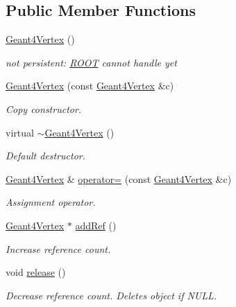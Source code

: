 \subsection*{Public Member Functions}
\begin{DoxyCompactItemize}
\item 
\hyperlink{class_d_d4hep_1_1_simulation_1_1_geant4_vertex_a6c266fa18efd7d4976c36074856c8bc4}{Geant4\+Vertex} ()
\begin{DoxyCompactList}\small\item\em not persistent\+: \hyperlink{namespace_r_o_o_t}{R\+O\+OT} cannot handle yet \end{DoxyCompactList}\item 
\hyperlink{class_d_d4hep_1_1_simulation_1_1_geant4_vertex_a5a5ec2a00b5e3fcdd5bd4b5e02131dbc}{Geant4\+Vertex} (const \hyperlink{class_d_d4hep_1_1_simulation_1_1_geant4_vertex}{Geant4\+Vertex} \&c)
\begin{DoxyCompactList}\small\item\em Copy constructor. \end{DoxyCompactList}\item 
virtual \hyperlink{class_d_d4hep_1_1_simulation_1_1_geant4_vertex_a82165b580eeb1104f6ff9ff27235fba7}{$\sim$\+Geant4\+Vertex} ()
\begin{DoxyCompactList}\small\item\em Default destructor. \end{DoxyCompactList}\item 
\hyperlink{class_d_d4hep_1_1_simulation_1_1_geant4_vertex}{Geant4\+Vertex} \& \hyperlink{class_d_d4hep_1_1_simulation_1_1_geant4_vertex_ac96f6fd10cd02f1920b937421832ca46}{operator=} (const \hyperlink{class_d_d4hep_1_1_simulation_1_1_geant4_vertex}{Geant4\+Vertex} \&c)
\begin{DoxyCompactList}\small\item\em Assignment operator. \end{DoxyCompactList}\item 
\hyperlink{class_d_d4hep_1_1_simulation_1_1_geant4_vertex}{Geant4\+Vertex} $\ast$ \hyperlink{class_d_d4hep_1_1_simulation_1_1_geant4_vertex_a9cf0eeb1c981f0f7ae77c0e2776340e6}{add\+Ref} ()
\begin{DoxyCompactList}\small\item\em Increase reference count. \end{DoxyCompactList}\item 
void \hyperlink{class_d_d4hep_1_1_simulation_1_1_geant4_vertex_a55c0c51d6d234531cdd6efe1ab83fc37}{release} ()
\begin{DoxyCompactList}\small\item\em Decrease reference count. Deletes object if N\+U\+LL. \end{DoxyCompactList}\end{DoxyCompactItemize}
